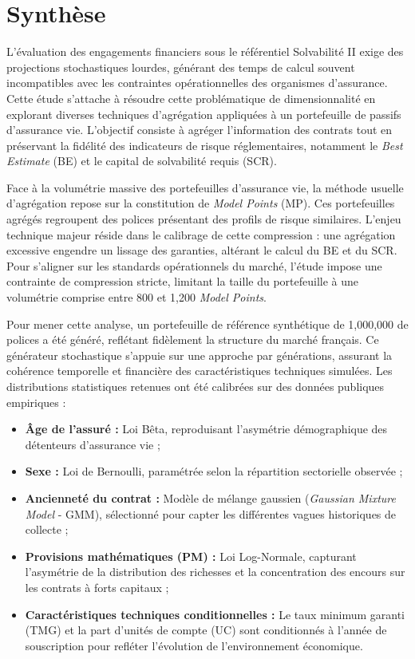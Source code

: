 \chapter*{Synthèse}

L'évaluation des engagements financiers sous le référentiel Solvabilité II exige des projections stochastiques lourdes, générant des temps de calcul souvent incompatibles avec les contraintes opérationnelles des organismes d'assurance. Cette étude s'attache à résoudre cette problématique de dimensionnalité en explorant diverses techniques d'agrégation appliquées à un portefeuille de passifs d'assurance vie. L'objectif consiste à agréger l'information des contrats tout en préservant la fidélité des indicateurs de risque réglementaires, notamment le \textit{Best Estimate} (BE) et le capital de solvabilité requis (SCR).

Face à la volumétrie massive des portefeuilles d'assurance vie, la méthode usuelle d'agrégation repose sur la constitution de \textit{Model Points} (MP). Ces portefeuilles agrégés regroupent des polices présentant des profils de risque similaires. L'enjeu technique majeur réside dans le calibrage de cette compression : une agrégation excessive engendre un lissage des garanties, altérant le calcul du BE et du SCR. Pour s'aligner sur les standards opérationnels du marché, l'étude impose une contrainte de compression stricte, limitant la taille du portefeuille à une volumétrie comprise entre 800 et 1,200 \textit{Model Points}.

Pour mener cette analyse, un portefeuille de référence synthétique de 1,000,000 de polices a été généré, reflétant fidèlement la structure du marché français. Ce générateur stochastique s'appuie sur une approche par générations, assurant la cohérence temporelle et financière des caractéristiques techniques simulées. Les distributions statistiques retenues ont été calibrées sur des données publiques empiriques :
\begin{itemize}
\item \textbf{Âge de l'assuré :} Loi Bêta, reproduisant l'asymétrie démographique des détenteurs d'assurance vie ;
\item \textbf{Sexe :} Loi de Bernoulli, paramétrée selon la répartition sectorielle observée ;
\item \textbf{Ancienneté du contrat :} Modèle de mélange gaussien (\textit{Gaussian Mixture Model} - GMM), sélectionné pour capter les différentes vagues historiques de collecte ;
\item \textbf{Provisions mathématiques (PM) :} Loi Log-Normale, capturant l'asymétrie de la distribution des richesses et la concentration des encours sur les contrats à forts capitaux ;
\item \textbf{Caractéristiques techniques conditionnelles :} Le taux minimum garanti (TMG) et la part d'unités de compte (UC) sont conditionnés à l'année de souscription pour refléter l'évolution de l'environnement économique.
\end{itemize}

